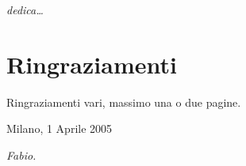 \begin{flushright}
\Large\textit{dedica\dots}
\end{flushright}

\cleardoublepage

\thispagestyle{empty}

\chapter*{Ringraziamenti}
Ringraziamenti vari, massimo una o due pagine.

\begin{flushleft}
Milano, 1 Aprile 2005
\end{flushleft}

\begin{flushright}
\emph{Fabio.}
\end{flushright}

\cleardoublepage